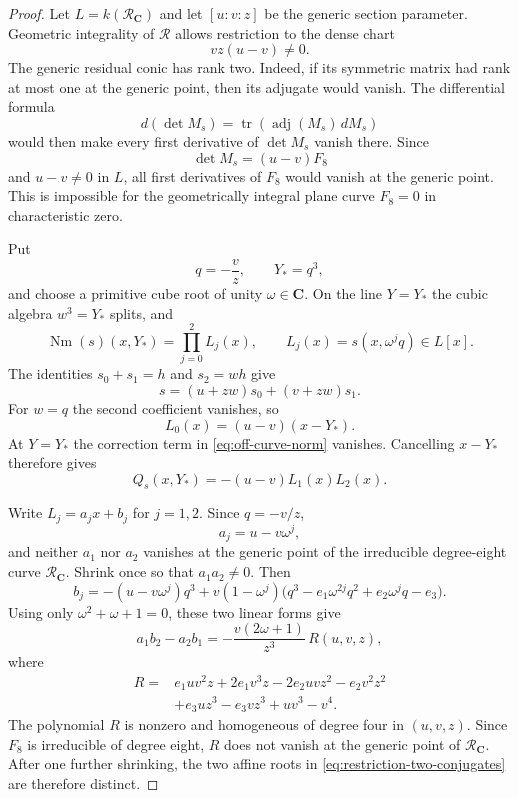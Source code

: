 \documentclass[10pt]{amsart}
\numberwithin{equation}{section}
\theoremstyle{definition}
\theoremstyle{remark}
\newcommand{\CC}{\mathbf C}
\newcommand{\Nm}{\operatorname{Nm}}
\begin{document}
\begin{proof}
Let $L=k(\mathscr R_{\CC})$ and let $[u:v:z]$ be the generic section
parameter.  Geometric integrality of $\mathscr R$ allows restriction to the
dense chart
\[
 vz(u-v)\ne0.
\]
The generic residual conic has rank two.  Indeed, if its symmetric matrix
had rank at most one at the generic point, then its adjugate would vanish.
The differential formula
\[
 d(\det M_s)=\operatorname{tr}(\operatorname{adj}(M_s)\,dM_s)
\]
would then make every first derivative of $\det M_s$ vanish there.  Since
\[
 \det M_s=(u-v)F_8
\]
and $u-v\ne0$ in $L$, all first derivatives of $F_8$ would vanish at the
generic point.  This is impossible for the geometrically integral plane
curve $F_8=0$ in characteristic zero.

Put
\[
 q=-\frac vz,\qquad Y_*=q^3,
\]
and choose a primitive cube root of unity $\omega\in\CC$.  On the line
$Y=Y_*$ the cubic algebra $w^3=Y_*$ splits, and
\[
 \Nm(s)(x,Y_*)=\prod_{j=0}^2 L_j(x),
 \qquad
 L_j(x)=s(x,\omega^jq)\in L[x].
\]
The identities $s_0+s_1=h$ and $s_2=wh$ give
\[
 s=(u+zw)s_0+(v+zw)s_1.
\]
For $w=q$ the second coefficient vanishes, so
\[
 L_0(x)=(u-v)(x-Y_*).
\]
At $Y=Y_*$ the correction term in \eqref{eq:off-curve-norm} vanishes.
Cancelling $x-Y_*$ therefore gives
\begin{equation}
 Q_s(x,Y_*)=-(u-v)L_1(x)L_2(x).
\label{eq:restriction-two-conjugates}
\end{equation}

Write $L_j=a_jx+b_j$ for $j=1,2$.  Since $q=-v/z$,
\[
 a_j=u-v\omega^j,
\]
and neither $a_1$ nor $a_2$ vanishes at the generic point of the
irreducible degree-eight curve $\mathscr R_{\CC}$.  Shrink once so that
$a_1a_2\ne0$.  Then
\[
 b_j=-(u-v\omega^j)q^3
     +v(1-\omega^j)
       \bigl(q^3-e_1\omega^{2j}q^2+e_2\omega^jq-e_3\bigr).
\]
Using only $\omega^2+\omega+1=0$, these two linear forms give
\begin{equation}
 a_1b_2-a_2b_1
 =-\frac{v(2\omega+1)}{z^3}\,R(u,v,z),
\label{eq:conjugate-root-separation}
\end{equation}
where
\begin{align*}
R={}&e_1uv^2z+2e_1v^3z-2e_2uvz^2-e_2v^2z^2\\
 &+e_3uz^3-e_3vz^3+uv^3-v^4.
\end{align*}
The polynomial $R$ is nonzero and homogeneous of degree four in $(u,v,z)$.
Since $F_8$ is irreducible of degree eight, $R$ does not vanish at the
generic point of $\mathscr R_{\CC}$.  After one further shrinking, the two
affine roots in \eqref{eq:restriction-two-conjugates} are therefore distinct.


\end{proof}
\end{document}
